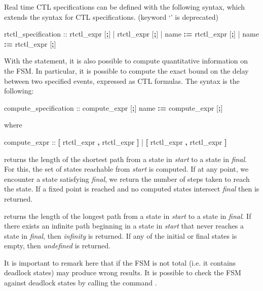 %
Real time CTL specifications can be defined with the following syntax,
which extends the syntax for CTL specifications. (keyword
`' is deprecated)
%
\begin{Grammar}
rtctl_specification ::  rtctl_expr [\textbf{;}]
                     |  rtctl_expr [\textbf{;}]
                     |   name \textbf{:=} rtctl_expr [\textbf{;}]
                     |   name \textbf{:=} rtctl_expr [\textbf{;}]
\end{Grammar}
%
With the  statement, it is also possible to compute
quantitative information on the FSM. 
%
In particular, it is possible to compute the exact bound on the delay
between two specified events, expressed as CTL formulas. 
%
The syntax is the following:
%
\begin{Grammar}
compute_specification ::  compute_expr [\textbf{;}]
                           name \textbf{:=} compute_expr [\textbf{;}]
\end{Grammar}
%
where
%
\begin{Grammar}
compute_expr ::  \textbf{[} rtctl_expr \textbf{,} rtctl_expr \textbf{]}
              |  \textbf{[} rtctl_expr \textbf{,} rtctl_expr \textbf{]}
\end{Grammar}
%
 returns the length of the shortest path from a state
in \textit{start} to a state in \textit{final}.
%
For this, the set of states reachable from \textit{start} is
computed. 
%
If at any point, we encounter a state satisfying \textit{final}, we
return the number of steps taken to reach the state. 
%
If a fixed point is reached and no computed states intersect
\textit{final} then  is returned.

\noindent{} returns the length of the longest path from a state
in \textit{start} to a state in \textit{final}. 
%
If there exists an infinite path beginning in a state in
\textit{start} that never reaches a state in \textit{final}, then
\textit{infinity} is returned. If any of the initial or final states 
is empty, then \textit{undefined} is returned.

It is important to remark here that if the FSM is not total (i.e. it
contains deadlock states)  may produce wrong
results. It is possible to check the FSM against deadlock states by
calling the command .


